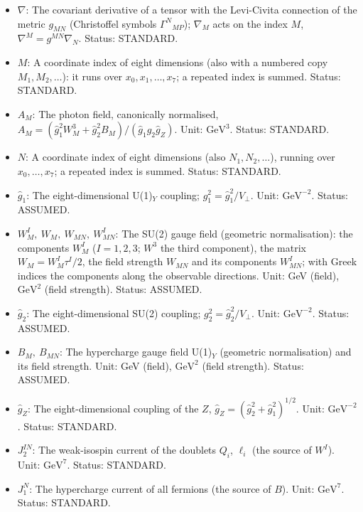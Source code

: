 \documentclass[
  10pt,
]{article}
\providecommand{\tightlist}{%
  \setlength{\itemsep}{0pt}\setlength{\parskip}{0pt}}
\begin{document}
\begin{itemize}
\tightlist
\item
  \(\nabla\): The covariant derivative of a tensor with the Levi-Civita
  connection of the metric \(g_{MN}\) (Christoffel symbols
  \(\Gamma^N{}_{MP}\)); \(\nabla_M\) acts on the index \(M\),
  \(\nabla^M = g^{MN}\nabla_N\). Status: STANDARD.
\item
  \(M\): A coordinate index of eight dimensions (also with a numbered
  copy \(M_1, M_2, \dots\)): it runs over \(x_0, x_1, \dots, x_7\); a
  repeated index is summed. Status: STANDARD.
\item
  \(A_M\): The photon field, canonically normalised,
  \(A_M = (\hat g_1^2W^3_M + \hat g_2^2B_M)/(\hat g_1\hat g_2\hat g_Z)\).
  Unit: \(\mathrm{GeV}^{3}\). Status: STANDARD.
\item
  \(N\): A coordinate index of eight dimensions (also
  \(N_1, N_2, \dots\)), running over \(x_0, \dots, x_7\); a repeated
  index is summed. Status: STANDARD.
\item
  \(\hat g_1\): The eight-dimensional U(1)\(_Y\) coupling;
  \(g_1^2 = \hat g_1^2/V_\perp\). Unit: \(\mathrm{GeV}^{-2}\). Status:
  ASSUMED.
\item
  \(W^I_M,\ W_M,\ W_{MN},\ W^I_{MN}\): The SU(2) gauge field (geometric
  normalisation): the components \(W^I_M\) (\(I = 1, 2, 3\); \(W^3\) the
  third component), the matrix \(W_M = W^I_M\tau^I/2\), the field
  strength \(W_{MN}\) and its components \(W^I_{MN}\); with Greek
  indices the components along the observable directions. Unit: GeV
  (field), \(\mathrm{GeV}^{2}\) (field strength). Status: ASSUMED.
\item
  \(\hat g_2\): The eight-dimensional SU(2) coupling;
  \(g_2^2 = \hat g_2^2/V_\perp\). Unit: \(\mathrm{GeV}^{-2}\). Status:
  ASSUMED.
\item
  \(B_M,\ B_{MN}\): The hypercharge gauge field U(1)\(_Y\) (geometric
  normalisation) and its field strength. Unit: GeV (field),
  \(\mathrm{GeV}^{2}\) (field strength). Status: ASSUMED.
\item
  \(\hat g_Z\): The eight-dimensional coupling of the \(Z\),
  \(\hat g_Z = (\hat g_2^2 + \hat g_1^2)^{1/2}\). Unit:
  \(\mathrm{GeV}^{-2}\). Status: STANDARD.
\item
  \(J_2^{IN}\): The weak-isospin current of the doublets \(Q_i\),
  \(\ell_i\) (the source of \(W^I\)). Unit: \(\mathrm{GeV}^{7}\).
  Status: STANDARD.
\item
  \(J_1^N\): The hypercharge current of all fermions (the source of
  \(B\)). Unit: \(\mathrm{GeV}^{7}\). Status: STANDARD.
\end{itemize}
\end{document}
